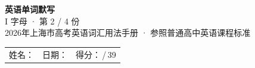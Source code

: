 \documentclass[10pt,a4paper]{article}
\begin{document}
\pagestyle{plain}

\begin{center}
{\LARGE\bfseries 英语单词默写}\\[0.22em]
{\large I 字母 · 第 2 / 4 份}\\[0.18em]
{\small 2026年上海市高考英语词汇用法手册 · 参照普通高中英语课程标准}
\end{center}

\vspace{0.25em}
\noindent\begin{tabular}{@{}p{}@{}p{}@{}p{}@{}}
姓名：\underline{\hspace{2.0cm}} & 日期：\underline{\hspace{2.0cm}} & 得分：\underline{\hspace{1.3cm}}\,/\,39 \\
\end{tabular}

\vspace{0.3em}

\vspace{0.08em}
\end{document}
